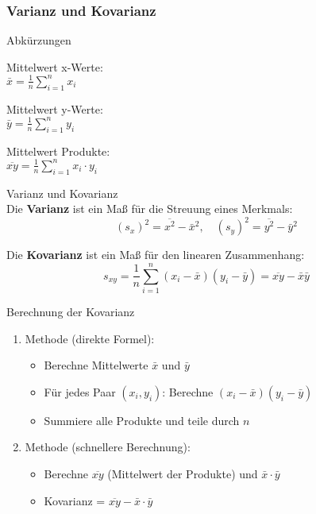 \subsubsection{Varianz und Kovarianz}

\begin{concept}{Abkürzungen}

\begin{minipage}[t]{0.3\linewidth}
Mittelwert x-Werte:\\
$\bar{x} = \frac{1}{n}\sum_{i=1}^{n} x_i$
\end{minipage}
\begin{minipage}[t]{0.3\linewidth}
Mittelwert y-Werte:\\
$\bar{y} = \frac{1}{n}\sum_{i=1}^{n} y_i$
\end{minipage}
\begin{minipage}[t]{0.3\linewidth}
Mittelwert Produkte:\\
$\overline{xy} = \frac{1}{n}\sum_{i=1}^{n} x_i \cdot y_i$
\end{minipage}
\end{concept}

\begin{corollary}{Varianz und Kovarianz}\\
Die \textbf{Varianz} ist ein Maß für die Streuung eines Merkmals:
\vspace{-2mm}\\
$$(s_x)^2 = \overline{x^2} - \bar{x}^2, \quad (s_y)^2 = \overline{y^2} - \bar{y}^2$$

Die \textbf{Kovarianz} ist ein Maß für den linearen Zusammenhang:
\vspace{-2mm}\\
$$s_{xy} = \frac{1}{n}\sum_{i=1}^n (x_i - \bar{x})(y_i - \bar{y}) = \overline{xy} - \bar{x}\bar{y}$$
\end{corollary}

\begin{KR}{Berechnung der Kovarianz}
\begin{enumerate}
    \item Methode (direkte Formel):
        \begin{itemize}
            \item Berechne Mittelwerte $\bar{x}$ und $\bar{y}$
            \item Für jedes Paar $(x_i,y_i)$: Berechne $(x_i - \bar{x})(y_i - \bar{y})$
            \item Summiere alle Produkte und teile durch $n$
        \end{itemize}
    \item Methode (schnellere Berechnung):
        \begin{itemize}
            \item Berechne $\overline{xy}$ (Mittelwert der Produkte) und $\bar{x} \cdot \bar{y}$
            \item Kovarianz = $\overline{xy} - \bar{x} \cdot \bar{y}$
        \end{itemize}
\end{enumerate}
\end{KR}

